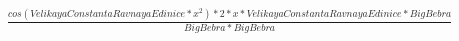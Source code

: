 \documentclass{article}
\begin{document}
$\frac{cos(VelikayaConstantaRavnayaEdinice*x^{2})*2*x*VelikayaConstantaRavnayaEdinice*BigBebra}{BigBebra*BigBebra}$
\end{document}
